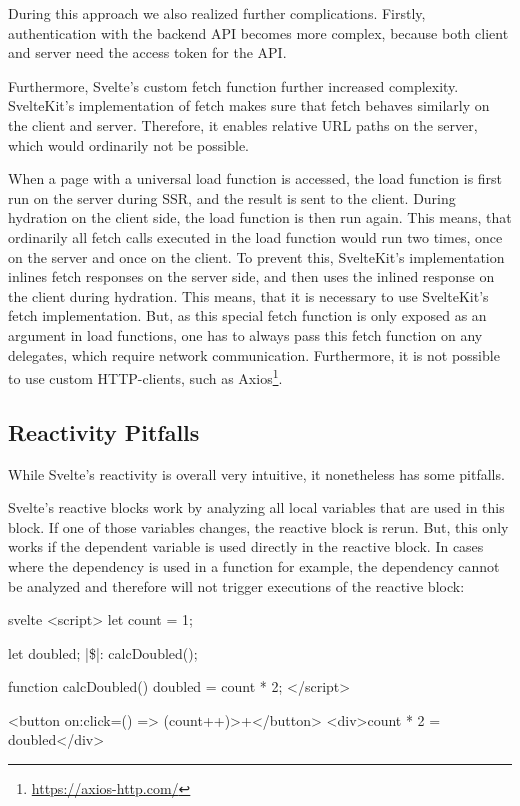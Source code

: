 During this approach we also realized further complications. Firstly, authentication with the backend API becomes more complex, because both client and server need the access token for the API.

Furthermore, Svelte's custom fetch function further increased complexity. SvelteKit's implementation of fetch makes sure that fetch behaves similarly on the client and server. Therefore, it enables relative URL paths on the server, which would ordinarily not be possible.

When a page with a universal load function is accessed, the load function is first run on the server during SSR, and the result is sent to the client. During hydration on the client side, the load function is then run again. This means, that ordinarily all fetch calls executed in the load function would run two times, once on the server and once on the client. To prevent this, SvelteKit's implementation inlines fetch responses on the server side, and then uses the inlined response on the client during hydration. This means, that it is necessary to use SvelteKit's fetch implementation. But, as this special fetch function is only exposed as an argument in load functions, one has to always pass this fetch function on any delegates, which require network communication. Furthermore, it is not possible to use custom HTTP-clients, such as Axios\footnote{\url{https://axios-http.com/}}.



\subsection{Reactivity Pitfalls}

While Svelte's reactivity is overall very intuitive, it nonetheless has some pitfalls.

Svelte's reactive blocks work by analyzing all local variables that are used in this block. If one of those variables changes, the reactive block is rerun. But, this only works if the dependent variable is used directly in the reactive block. In cases where the dependency is used in a function for example, the dependency cannot be analyzed and therefore will not trigger executions of the reactive block:

\begin{myminted}[escapeinside=||, autogobble]{svelte}{}
<script>
    let count = 1;

    let doubled;
    |\$|: calcDoubled();

    function calcDoubled() {
    doubled = count * 2;
    }
</script>

<button on:click={() => (count++)}>+</button>
<div>{count} * 2 = {doubled}</div>
\end{myminted}


